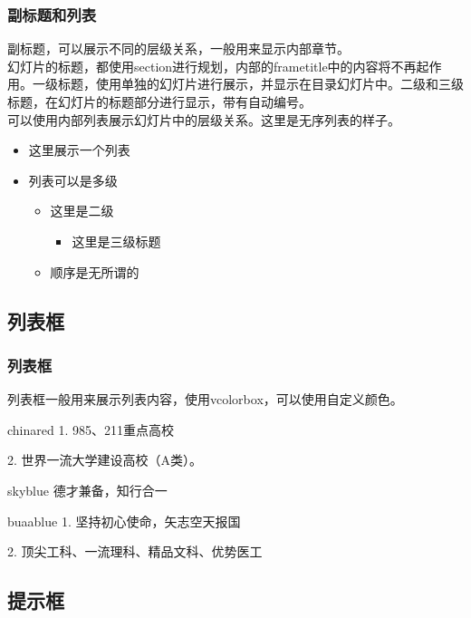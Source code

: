 \documentclass[aspectratio=169,UTF8,t]{beamer}%
\begin{document}
\begin{frame}
    \frametitle{副标题和列表}
    副标题，可以展示不同的层级关系，一般用来显示内部章节。\\
    幻灯片的标题，都使用section进行规划，内部的frametitle中的内容将不再起作用。一级标题，使用单独的幻灯片进行展示，并显示在目录幻灯片中。二级和三级标题，在幻灯片的标题部分进行显示，带有自动编号。\\
    可以使用内部列表展示幻灯片中的层级关系。这里是无序列表的样子。
    \begin{itemize}
        \item 这里展示一个列表 
        \item 列表可以是多级
        \begin{itemize}
            \item 这里是二级
            \begin{itemize}
                \item 这里是三级标题
            \end{itemize}
            \item 顺序是无所谓的
        \end{itemize}
    \end{itemize}
\end{frame}

\subsection{列表框}

\begin{frame}
    \frametitle{列表框}
    列表框一般用来展示列表内容，使用vcolorbox，可以使用自定义颜色。
    \begin{vcolorbox}[北京航空航天大学]{chinared}
        1. 985、211重点高校

        2. 世界一流大学建设高校（A类）。
    \end{vcolorbox}
    \begin{vcolorbox}[学校校训]{skyblue}
        德才兼备，知行合一
    \end{vcolorbox}
    \begin{vcolorbox}[学校特色]{buaablue}
        1. 坚持初心使命，矢志空天报国
        
        2. 顶尖工科、一流理科、精品文科、优势医工
    \end{vcolorbox}
\end{frame}

\subsection{提示框}
\end{document}
